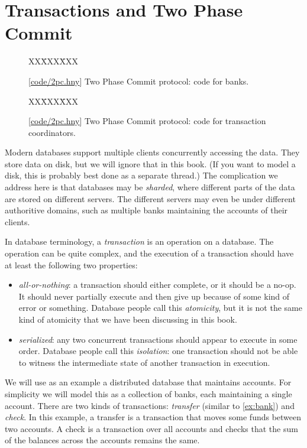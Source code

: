 \documentclass{report}
\newcommand{\harmonysource}[1]{
\begin{tabbing}
XX\=XXX\=XXX\kill
    
\end{tabbing}
}
\newcommand{\harmonylink}[1]{%
[\href{https://harmony.cs.cornell.edu/#1}{\underline{#1}}]%
}
\newenvironment{code}{
\tcolorbox
}{
\endtcolorbox
}
\begin{document}
\chapter{Transactions and Two Phase Commit}
\label{ch:2pc}

\begin{figure}
\begin{code}
\harmonysource{2pc1}
\end{code}
\caption{\harmonylink{code/2pc.hny} Two Phase Commit protocol: code for banks.}
\label{fig:2pc1}
\end{figure}

\begin{figure}
\begin{code}
\harmonysource{2pc2}
\end{code}
\caption{\harmonylink{code/2pc.hny} Two Phase Commit protocol: code for transaction coordinators.}
\label{fig:2pc2}
\end{figure}

Modern databases support multiple clients concurrently accessing the data.
They store data on disk, but we will ignore that in this book.
(If you want to model a disk, this is probably best done as a separate
thread.)
The complication we address here is that databases may be \emph{sharded},
where different parts of the data are stored on different servers.
The different servers may even be under different
authoritive domains, such as multiple banks maintaining the accounts of their
clients.

In database terminology, a \emph{transaction} is an operation on a database.
The operation can be quite complex, and the execution of a transaction
should have at least the following two properties:
\begin{itemize}
\item \emph{all-or-nothing}: a transaction should either complete, or it should
be a no-op.  It should never partially execute and then give up because of
some kind of error or something.  Database
people call this \emph{atomicity}, but it is not the same kind of atomicity that
we have been discussing in this book.
\item \emph{serialized}: any two concurrent transactions should appear to
execute in some order.  Database people call this \emph{isolation}: one transaction
should not be able to witness the intermediate state of another transaction
in execution.
\end{itemize}

We will use as an example a distributed database that maintains accounts.
For simplicity we will model this as a collection of banks, each maintaining a
single account.  There are two kinds of transactions: \emph{transfer}
(similar to \autoref{ex:bank}) and \emph{check}.  In this example, a transfer
is a transaction that moves some funds between two accounts.
A check is a transaction over all accounts and checks that the sum of the
balances across the accounts remains the same.
\end{document}
